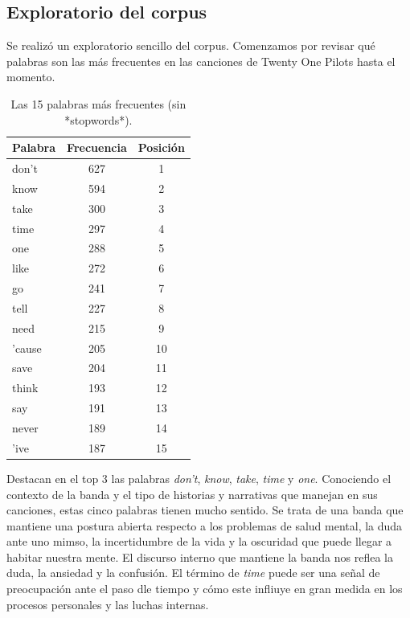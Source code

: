 \subsection{Exploratorio del corpus}

Se realizó un exploratorio sencillo del corpus. Comenzamos por revisar qué palabras son las más frecuentes
en las canciones de Twenty One Pilots hasta el momento. 

\begin{table}[h!]
    \centering
    \caption{Las 15 palabras más frecuentes (sin *stopwords*).}
    \label{tab:frequent_words}
    \begin{tabular}{l c c}
        \toprule
        \textbf{Palabra} & \textbf{Frecuencia} & \textbf{Posición} \\
        \midrule
        don't & 627 & 1 \\
        know & 594 & 2 \\
        take & 300 & 3 \\
        time & 297 & 4 \\
        one & 288 & 5 \\
        like & 272 & 6 \\
        go & 241 & 7 \\
        tell & 227 & 8 \\
        need & 215 & 9 \\
        'cause & 205 & 10 \\
        save & 204 & 11 \\
        think & 193 & 12 \\
        say & 191 & 13 \\
        never & 189 & 14 \\
        'ive & 187 & 15 \\
        \bottomrule
    \end{tabular}
\end{table}

Destacan en el top 3 las palabras \textit{don't}, \textit{know}, \textit{take}, \textit{time}
y \textit{one}. Conociendo el contexto de la banda y el tipo de historias y narrativas que manejan
en sus canciones, estas cinco palabras tienen mucho sentido. Se trata de una banda que mantiene
una postura abierta respecto a los problemas de salud mental, la duda ante uno mimso, la incertidumbre
de la vida y la oscuridad que puede llegar a habitar nuestra mente. El discurso interno que mantiene
la banda nos reflea la duda, la ansiedad y la confusión. El término de \textit{time} puede ser 
una señal de preocupación ante el paso dle tiempo y cómo este infliuye en gran medida en los 
procesos personales y las luchas internas. 

